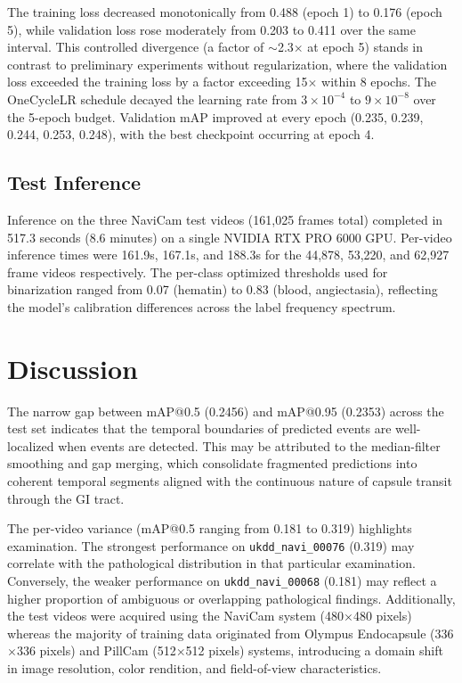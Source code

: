 \documentclass[12pt]{article}
\begin{document}
The training loss decreased monotonically from 0.488 (epoch 1) to 0.176 (epoch 5), while validation loss rose moderately from 0.203 to 0.411 over the same interval. This controlled divergence (a factor of $\sim$2.3$\times$ at epoch 5) stands in contrast to preliminary experiments without regularization, where the validation loss exceeded the training loss by a factor exceeding 15$\times$ within 8 epochs. The OneCycleLR schedule decayed the learning rate from $3\times10^{-4}$ to $9\times10^{-8}$ over the 5-epoch budget. Validation mAP improved at every epoch (0.235, 0.239, 0.244, 0.253, 0.248), with the best checkpoint occurring at epoch 4.

\subsection{Test Inference}

Inference on the three NaviCam test videos (161,025 frames total) completed in 517.3 seconds (8.6 minutes) on a single NVIDIA RTX PRO 6000 GPU. Per-video inference times were 161.9s, 167.1s, and 188.3s for the 44,878, 53,220, and 62,927 frame videos respectively. The per-class optimized thresholds used for binarization ranged from 0.07 (hematin) to 0.83 (blood, angiectasia), reflecting the model's calibration differences across the label frequency spectrum.


\section{Discussion}\label{sec4}

The narrow gap between mAP@0.5 (0.2456) and mAP@0.95 (0.2353) across the test set indicates that the temporal boundaries of predicted events are well-localized when events are detected. This may be attributed to the median-filter smoothing and gap merging, which consolidate fragmented predictions into coherent temporal segments aligned with the continuous nature of capsule transit through the GI tract.

The per-video variance (mAP@0.5 ranging from 0.181 to 0.319) highlights examination. The strongest performance on \texttt{ukdd\_navi\_00076} (0.319) may correlate with the pathological distribution in that particular examination. Conversely, the weaker performance on \texttt{ukdd\_navi\_00068} (0.181) may reflect a higher proportion of ambiguous or overlapping pathological findings. Additionally, the test videos were acquired using the NaviCam system (480$\times$480 pixels) whereas the majority of training data originated from Olympus Endocapsule (336$\times$336 pixels) and PillCam (512$\times$512 pixels) systems, introducing a domain shift in image resolution, color rendition, and field-of-view characteristics.
\end{document}

